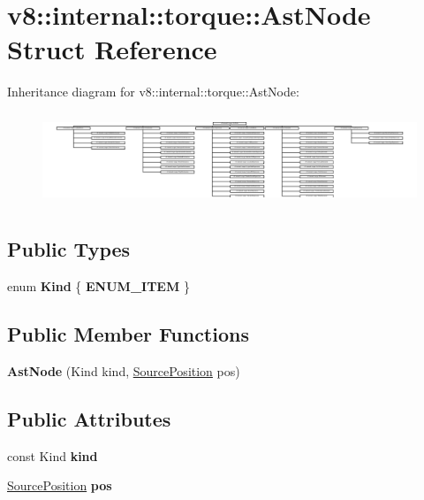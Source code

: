 \hypertarget{structv8_1_1internal_1_1torque_1_1AstNode}{}\section{v8\+:\+:internal\+:\+:torque\+:\+:Ast\+Node Struct Reference}
\label{structv8_1_1internal_1_1torque_1_1AstNode}
Inheritance diagram for v8\+:\+:internal\+:\+:torque\+:\+:Ast\+Node\+:\begin{figure}[H]
\begin{center}
\leavevmode
\includegraphics[height=2.791277cm]{structv8_1_1internal_1_1torque_1_1AstNode}
\end{center}
\end{figure}
\subsection*{Public Types}
\begin{DoxyCompactItemize}
\item 
\mbox{\label{structv8_1_1internal_1_1torque_1_1AstNode_a1bf0d0e4f3b22f876ce8aa84ad1ba304}} 
enum {\bfseries Kind} \{ {\bfseries E\+N\+U\+M\+\_\+\+I\+T\+EM}
 \}
\end{DoxyCompactItemize}
\subsection*{Public Member Functions}
\begin{DoxyCompactItemize}
\item 
\mbox{\label{structv8_1_1internal_1_1torque_1_1AstNode_a9943e8e1e1581a10ec346c4c54612d30}} 
{\bfseries Ast\+Node} (Kind kind, \mbox{\hyperlink{structv8_1_1internal_1_1torque_1_1SourcePosition}{Source\+Position}} pos)
\end{DoxyCompactItemize}
\subsection*{Public Attributes}
\begin{DoxyCompactItemize}
\item 
\mbox{\label{structv8_1_1internal_1_1torque_1_1AstNode_a880ee96e447bddb8e7aa7b93546e68c1}} 
const Kind {\bfseries kind}
\item 
\mbox{\label{structv8_1_1internal_1_1torque_1_1AstNode_a8edad203fe915507c233723aafc0ba0d}} 
\mbox{\hyperlink{structv8_1_1internal_1_1torque_1_1SourcePosition}{Source\+Position}} {\bfseries pos}
\end{DoxyCompactItemize}


